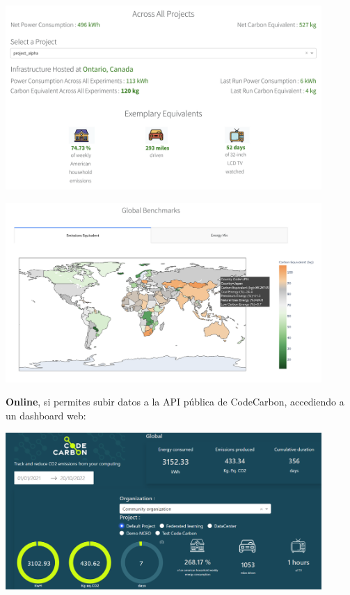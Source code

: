 \documentclass[12pt,a4paper]{report}
\begin{document}
\begin{center}
  \includegraphics[width=0.9\textwidth]{imagenes/CC_1.png}
\end{center}

\begin{center}
  \includegraphics[width=0.9\textwidth]{imagenes/CC_2.png}
\end{center}

\textbf{Online}, si permites subir datos a la API pública de CodeCarbon, accediendo a un dashboard web:

\begin{center}
  \includegraphics[width=0.9\textwidth]{imagenes/CC_3.png}
\end{center}
\end{document}
